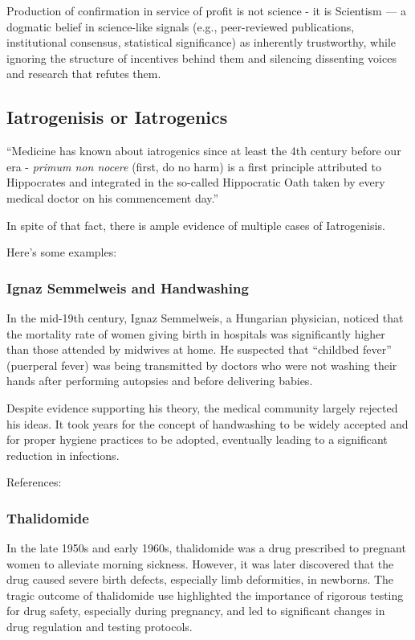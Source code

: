Production of confirmation in service of profit is not science - it is Scientism — a dogmatic belief in science-like signals (e.g., peer-reviewed publications, institutional consensus, statistical significance) as inherently trustworthy, while ignoring the structure of incentives behind them and silencing dissenting voices and research that refutes them.

\subsection{Iatrogenisis or Iatrogenics}

``Medicine has known about iatrogenics since at least the 4th century before our era - \emph{primum non nocere} (first, do no harm) is a first principle attributed to Hippocrates and integrated in the so-called Hippocratic Oath taken by every medical doctor on his commencement day.''\cite{Taleb2012}

In spite of that fact, there is ample evidence of multiple cases of Iatrogenisis. \cite{VarleyVarma2021}

Here's some examples:

\subsubsection{Ignaz Semmelweis and Handwashing}

In the mid-19th century, Ignaz Semmelweis, a Hungarian physician, noticed that the mortality rate of women giving birth in hospitals was significantly higher than those attended by midwives at home. He suspected that  ``childbed fever'' (puerperal fever) was being transmitted by doctors who were not washing their hands after performing autopsies and before delivering babies.

Despite evidence supporting his theory, the medical community largely rejected his ideas. It took years for the concept of handwashing to be widely accepted and for proper hygiene practices to be adopted, eventually leading to a significant reduction in infections.

References: \cite{Semmelweis2006}

\subsubsection{Thalidomide}
In the late 1950s and early 1960s, thalidomide was a drug prescribed to pregnant women to alleviate morning sickness. However, it was later discovered that the drug caused severe birth defects, especially limb deformities, in newborns. The tragic outcome of thalidomide use highlighted the importance of rigorous testing for drug safety, especially during pregnancy, and led to significant changes in drug
regulation and testing protocols.

